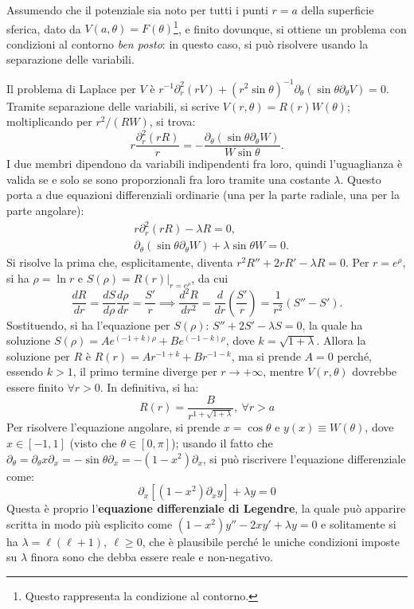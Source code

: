 \documentclass[11pt, a4paper]{scrartcl}
\theoremstyle{definition}
\numberwithin{esempio}{section}
\theoremstyle{definition}
\numberwithin{obs}{section}
\numberwithin{nota}{section}
\numberwithin{equation}{subsection}
\begin{document}
Assumendo che il potenziale sia noto per tutti i punti $r = a$ della superficie sferica, dato da $V(a,\theta ) = F(\theta )$\footnote{Questo rappresenta la condizione al contorno.}, e finito dovunque, si ottiene un problema con condizioni al contorno \textit{ben posto}: in questo caso, si pu\`o risolvere usando la separazione delle variabili.

Il problema di Laplace per $V$ \`e $r^{-1} \partial ^2_r (rV) + (r^2 \sin \theta )^{-1} \partial _\theta (\sin \theta \partial _\theta V)= 0$.
Tramite separazione delle variabili, si scrive $V(r,\theta ) = R(r) W(\theta )$; moltiplicando per $r^2 / (RW)$, si trova:
\begin{equation}
	r \frac{\partial _r^2(rR)}{r} = - \frac{\partial _\theta (\sin \theta \partial _\theta W)}{W\sin \theta }.
\end{equation}
I due membri dipendono da variabili indipendenti fra loro, quindi l'uguaglianza \`e valida se e solo se sono proporzionali fra loro tramite una costante $\lambda$. 
Questo porta a due equazioni differenziali ordinarie (una per la parte radiale, una per la parte angolare):
\[
\begin{split}
	&r \partial _r^2(r R) - \lambda R = 0, \\
	& \partial _\theta (\sin \theta \partial _\theta W) + \lambda \sin \theta W= 0 .
\end{split}
\] 
Si risolve la prima che, esplicitamente, diventa $r^2 R''+ 2rR' - \lambda R = 0$.
Per $r = e^\rho $, si ha $\rho  = \ln r$ e $S(\rho ) = R(r)|_{r= e^\rho } $, da cui
\[
	\frac{d R}{d r} = \frac{d S}{d \rho } \frac{d \rho }{d r} = \frac{S'}{r} \implies \frac{d ^2 R}{d r^2} =  \frac{d }{d r} \left(\frac{S'}{r}\right) = \frac{1}{r^2} (S'' - S'). 
\] 
Sostituendo, si ha l'equazione per $S(\rho )$: $S'' + 2S' - \lambda S = 0$, la quale ha soluzione $S(\rho ) = Ae^{(-1+k)\rho } + B e^{(-1-k)  \rho } $, dove $k = \sqrt{1+\lambda } $.
Allora la soluzione per $R$ \`e $R(r) = Ar^{-1+k} + B r^{-1-k} $, ma si prende $A= 0$ perch\'e, essendo $k> 1 $, il primo termine diverge per $r\to +\infty$, mentre $V(r,\theta )$ dovrebbe essere finito $\forall r > 0$.
In definitiva, si ha:
\begin{equation}
	R(r) = \frac{B}{r^{1+\sqrt{1+\lambda } }  }, \  \forall r> a
\end{equation}
Per risolvere l'equazione angolare, si prende $x = \cos \theta $ e $y(x) \equiv W(\theta )$, dove $x \in \left[ -1,1 \right] $ (visto che $\theta  \in  \left[ 0,\pi \right] $); usando il fatto che $\partial _\theta = \partial _\theta x \partial _x=-\sin \theta \partial _x = -(1-x^2) \partial _x$, si pu\`o riscrivere l'equazione differenziale come:
\begin{equation}
	\partial _x\left[ (1-x^2)\partial _x y  \right]  + \lambda y = 0
\end{equation}
Questa \`e proprio l'\textbf{equazione differenziale di Legendre}, la quale pu\`o apparire scritta in modo pi\`u esplicito come $(1-x^2) y'' - 2xy' + \lambda y = 0$ e solitamente si ha $\lambda  = \ell (\ell +1), \ \ell \ge 0$, che \`e plausibile perch\'e le uniche condizioni imposte su $\lambda $ finora sono che debba essere reale e non-negativo.
\end{document}
